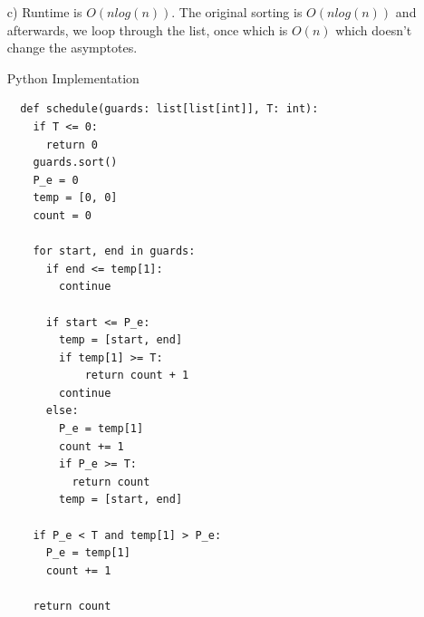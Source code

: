 \documentclass[12pt]{article}
\begin{document}
\begin{enumerate}
\begin{proof}
  If $n = m$, then $n + 1 > m$. Proof ends trivially.
  
  If $n < m$, then we also know by inductive assumption that $b_{i_n} \geq b_{i_n}'$. Since $S_o$ is a valid schedule, then the next guard in $S_o, ~G_{n+1}' = [a_{i_{n+1}}', b_{i_{n+1}}']$ will have some start time $a_{i_{n+1}}' \leq b_{i_n}' \leq b_{i_n}$ so $G_{n+1}'$ is a valid choice for the next guard in $S$ and $G_{n+1}$ will stay for at least as long as $G_{n+1}'$.

  $\Rightarrow \forall 1 \leq j \leq m', \text{ either } m < j \text{ or } b_{i_j} \geq b_{i_j}'$
\end{proof}

  Therefore, the greedy solution is as optimal as any solution.

\item[c)] Runtime is $O(nlog(n))$. The original sorting is $O(nlog(n))$ and afterwards, we loop through the list, once which is $O(n)$ which doesn't change the asymptotes.

\begin{algorithm}[H]
\caption{Python Implementation}
\begin{lstlisting}
  def schedule(guards: list[list[int]], T: int):
    if T <= 0:
      return 0
    guards.sort()
    P_e = 0
    temp = [0, 0]
    count = 0

    for start, end in guards:
      if end <= temp[1]:
        continue
      
      if start <= P_e:
        temp = [start, end]
        if temp[1] >= T:
            return count + 1
        continue
      else:
        P_e = temp[1]
        count += 1
        if P_e >= T:
          return count
        temp = [start, end]
        
    if P_e < T and temp[1] > P_e:
      P_e = temp[1]
      count += 1

    return count
\end{lstlisting}
\end{algorithm}
\end{enumerate}
\end{document}
